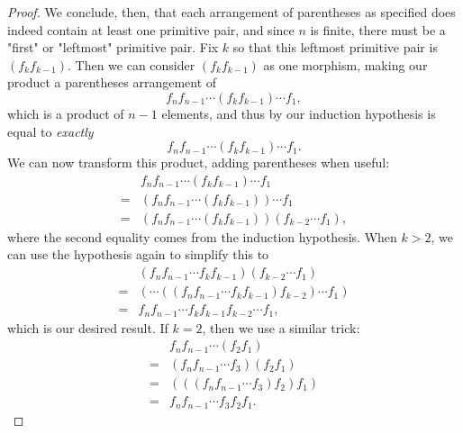 \documentclass{article}
\theoremstyle{definition}
\begin{document}
\begin{proof}
	We conclude, then, that each arrangement of parentheses as specified does indeed contain at least one primitive pair, and since $n$ is finite, there must be a "first" or "leftmost" primitive pair.
	Fix $k$ so that this leftmost primitive pair is $(f_kf_{k-1})$.
	Then we can consider $(f_k f_{k - 1})$ as one morphism, making our product a parentheses arrangement of \begin{equation*}
		f_n f_{n-1} \cdots (f_kf_{k - 1}) \cdots f_1,
	\end{equation*}
	which is a product of $n - 1$ elements, and thus by our induction hypothesis is equal to \textit{exactly} \begin{equation*}
		f_n f_{n-1} \cdots (f_kf_{k - 1}) \cdots f_1.
	\end{equation*}
	We can now transform this product, adding parentheses when useful: \begin{align*}
		  & f_n f_{n-1} \cdots (f_kf_{k - 1}) \cdots f_1                \\
		= & (f_n f_{n-1} \cdots (f_kf_{k - 1})) \cdots f_1              \\
		= & (f_n f_{n-1} \cdots (f_kf_{k - 1})) (f_{k - 2} \cdots f_1),
	\end{align*}
	where the second equality comes from the induction hypothesis.
	When $k > 2$, we can use the hypothesis again to simplify this to \begin{align*}
		  & (f_n f_{n-1} \cdots f_kf_{k - 1}) (f_{k - 2} \cdots f_1)         \\
		= & (\cdots((f_n f_{n-1} \cdots f_kf_{k - 1}) f_{k - 2}) \cdots f_1) \\
		= & f_n f_{n-1} \cdots f_kf_{k - 1} f_{k - 2} \cdots f_1,
	\end{align*}
	which is our desired result.
	If $k = 2$, then we use a similar trick: \begin{align*}
		  & f_n f_{n-1} \cdots (f_2 f_1)       \\
		= & (f_n f_{n-1} \cdots f_3) (f_2 f_1) \\
		= & (((f_n f_{n-1}\cdots f_3)f_2)f_1)  \\
		= & f_n f_{n-1}\cdots f_3f_2f_1.
	\end{align*}
\end{proof}
\end{document}
